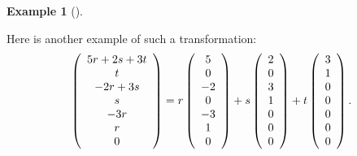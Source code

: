 \documentclass[numbers=enddot,12pt,final,onecolumn,notitlepage]{scrartcl}%
\theoremstyle{definition}
\newtheorem{exam}[theo]{Example}
\newenvironment{example}[1][]
{\begin{exam}[#1]\begin{leftbar}}
{\end{leftbar}\end{exam}}
\begin{document}
\begin{example}
Here is another example of such a transformation:%
\[
\left(
\begin{array}
[c]{c}%
5r+2s+3t\\
t\\
-2r+3s\\
s\\
-3r\\
r\\
0
\end{array}
\right)  =r\left(
\begin{array}
[c]{c}%
5\\
0\\
-2\\
0\\
-3\\
1\\
0
\end{array}
\right)  +s\left(
\begin{array}
[c]{c}%
2\\
0\\
3\\
1\\
0\\
0\\
0
\end{array}
\right)  +t\left(
\begin{array}
[c]{c}%
3\\
1\\
0\\
0\\
0\\
0\\
0
\end{array}
\right)  .
\]

\end{example}
\end{document}
